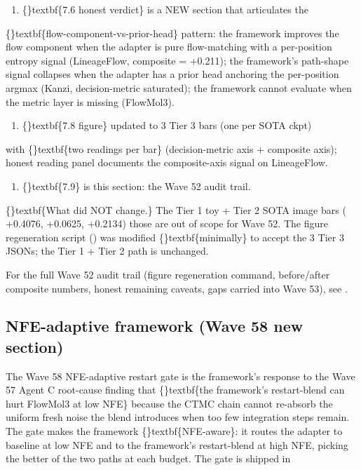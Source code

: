 \documentclass{article}
\begin{document}
\begin{enumerate}
\item \{\}textbf\{7.6 honest verdict\} is a NEW section that articulates the
\end{enumerate}
\{\}textbf\{flow-component-vs-prior-head\} pattern: the framework improves the flow component when the adapter is pure flow-matching with a per-position entropy signal (LineageFlow, composite = +0.211); the framework's path-shape signal collapses when the adapter has a prior head anchoring the per-position argmax (Kanzi, decision-metric saturated); the framework cannot evaluate when the metric layer is missing (FlowMol3).

\begin{enumerate}
\item \{\}textbf\{7.8 figure\} updated to 3 Tier 3 bars (one per SOTA ckpt)
\end{enumerate}
with \{\}textbf\{two readings per bar\} (decision-metric axis + composite axis); honest reading panel documents the composite-axis signal on LineageFlow.

\begin{enumerate}
\item \{\}textbf\{7.9\} is this section: the Wave 52 audit trail.
\end{enumerate}
\{\}textbf\{What did NOT change.\} The Tier 1 toy + Tier 2 SOTA image bars ( +0.4076,  +0.0625,  +0.2134)  those are out of scope for Wave 52. The figure regeneration script () was modified \{\}textbf\{minimally\} to accept the 3 Tier 3 JSONs; the Tier 1 + Tier 2 path is unchanged.

For the full Wave 52 audit trail (figure regeneration command, before/after composite numbers, honest remaining caveats, gaps carried into Wave 53), see .

\subsection{NFE-adaptive framework (Wave 58  new section)}
The Wave 58 NFE-adaptive restart gate is the framework's response to the Wave 57 Agent C root-cause finding that \{\}textbf\{the framework's restart-blend can hurt FlowMol3 at low NFE\} because the CTMC chain cannot re-absorb the uniform fresh noise the blend introduces when too few integration steps remain. The gate makes the framework \{\}textbf\{NFE-aware\}: it routes the adapter to baseline at low NFE and to the framework's restart-blend at high NFE, picking the better of the two paths at each budget. The gate is shipped in
\end{document}
